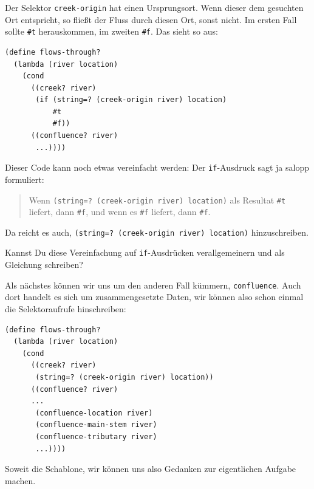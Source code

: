 %
Der Selektor \lstinline{creek-origin} hat einen Ursprungsort.  Wenn dieser dem
gesuchten Ort entspricht, so fließt der Fluss durch diesen Ort, sonst
nicht.  Im ersten Fall sollte \lstinline{#t} herauskommen, im zweiten
\lstinline{#f}.  Das sieht so aus:
%
\begin{lstlisting}
(define flows-through?
  (lambda (river location)
    (cond
      ((creek? river)
       (if (string=? (creek-origin river) location)
           #t
           #f))
      ((confluence? river)
       ...))))
\end{lstlisting}
%
Dieser Code kann noch etwas vereinfacht werden: Der
\lstinline{if}-Ausdruck sagt ja salopp formuliert:
%
\begin{quote}
  Wenn \lstinline{(string=? (creek-origin river) location)} als
  Resultat \lstinline{#t} liefert, dann \lstinline{#f}, und wenn es
  \lstinline{#f} liefert, dann \lstinline{#f}.
\end{quote}
%
Da reicht es auch, \lstinline{(string=? (creek-origin river) location)} hinzuschreiben.
%
\begin{aufgabeinline}\label{aufgabe:iftruefalse}
  Kannst Du diese Vereinfachung auf \lstinline{if}-Ausdrücken
  verallgemeinern und als Gleichung schreiben?
\end{aufgabeinline}
%
Als nächstes können wir uns um den anderen Fall kümmern,
\lstinline{confluence}.  Auch dort handelt es sich um
zusammengesetzte Daten, wir können also schon einmal die
Selektoraufrufe hinschreiben:
%
\begin{lstlisting}
(define flows-through?
  (lambda (river location)
    (cond
      ((creek? river)
       (string=? (creek-origin river) location))
      ((confluence? river)
      ...
       (confluence-location river)
       (confluence-main-stem river)
       (confluence-tributary river)
       ...))))
\end{lstlisting}
%
Soweit die Schablone, wir können uns also Gedanken zur eigentlichen
Aufgabe machen.

